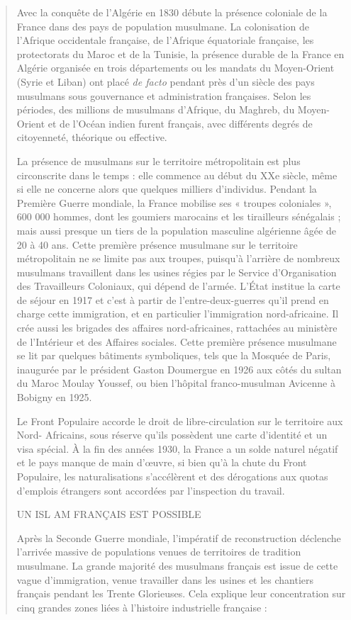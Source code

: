 \begin{quote}
Avec la conquête de l'Algérie en 1830 débute la présence coloniale de la
France dans des pays de population musulmane. La colonisation de
l'Afrique occidentale française, de l'Afrique équatoriale française, les
protectorats du Maroc et de la Tunisie, la présence durable de la France
en Algérie organisée en trois départements ou les mandats du
Moyen-Orient (Syrie et Liban) ont placé \emph{de facto} pendant près
d'un siècle des pays musulmans sous gouvernance et administration
françaises. Selon les périodes, des millions de musulmans d'Afrique, du
Maghreb, du Moyen- Orient et de l'Océan indien furent français, avec
différents degrés de citoyenneté, théorique ou effective.

La présence de musulmans sur le territoire métropolitain est plus
circonscrite dans le temps : elle commence au début du XXe siècle, même
si elle ne concerne alors que quelques milliers d'individus. Pendant la
Première Guerre mondiale, la France mobilise ses « troupes coloniales »,
600 000 hommes, dont les goumiers marocains et les tirailleurs
sénégalais ; mais aussi presque un tiers de la population masculine
algérienne âgée de 20 à 40 ans. Cette première présence musulmane sur le
territoire métropolitain ne se limite pas aux troupes, puisqu'à
l'arrière de nombreux musulmans travaillent dans les usines régies par
le Service d'Organisation des Travailleurs Coloniaux, qui dépend de
l'armée. L'État institue la carte de séjour en 1917 et c'est à partir de
l'entre-deux-guerres qu'il prend en charge cette immigration, et en
particulier l'immigration nord-africaine. Il crée aussi les brigades des
affaires nord-africaines, rattachées au ministère de l'Intérieur et des
Affaires sociales. Cette première présence musulmane se lit par quelques
bâtiments symboliques, tels que la Mosquée de Paris, inaugurée par le
président Gaston Doumergue en 1926 aux côtés du sultan du Maroc Moulay
Youssef, ou bien l'hôpital franco-musulman Avicenne à Bobigny en 1925.

Le Front Populaire accorde le droit de libre-circulation sur le
territoire aux Nord- Africains, sous réserve qu'ils possèdent une carte
d'identité et un visa spécial. À la fin des années 1930, la France a un
solde naturel négatif et le pays manque de main d'œuvre, si bien qu'à la
chute du Front Populaire, les naturalisations s'accélèrent et des
dérogations aux quotas d'emplois étrangers sont accordées par
l'inspection du travail.

UN ISL AM FRANÇAIS EST POSSIBLE

Après la Seconde Guerre mondiale, l'impératif de reconstruction
déclenche l'arrivée massive de populations venues de territoires de
tradition musulmane. La grande majorité des musulmans français est issue
de cette vague d'immigration, venue travailler dans les usines et les
chantiers français pendant les Trente Glorieuses. Cela explique leur
concentration sur cinq grandes zones liées à l'histoire industrielle
française :
\end{quote}

